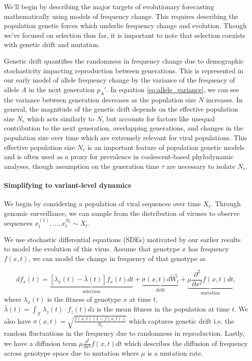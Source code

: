 We'll begin by describing the major targets of evolutionary forecasting mathematically using models of frequency change.
This requires describing the population genetic forces which underlie frequency change and evolution.
Though we've focused on selection thus far, it is important to note that selection coexists with genetic drift and mutation.

Genetic drift quantifies the randomness in frequency change due to demographic stochasticity impacting reproduction between generations.
This is represented in our early model of allele frequency change by the variance of the frequency of allele $A$ in the next generation $p_A'$.
In equation \ref{eq:allele_variance}, we can see the variance between generation decreases as the population size $N$ increases.
In general, the magnitude of the genetic drift depends on the effective population size $N_e$ which acts similarly to $N$, but accounts for factors like unequal contribution to the next generation, overlapping generations, and changes in the population size over time which are extremely relevant for viral populations.
This effective population size $N_e$ is an important feature of population genetic models and is often used as a proxy for prevalence in coalescent-based phylodynamic analyses, though assumption on the generation time $\tau$ are necessary to isolate $N_e$. \cite{MullerWagner2021}

\paragraph{Simplifying to variant-level dynamics}

We begin by considering a population of viral sequences over time $X_t$.
Through genomic surveillance, we can sample from the distribution of viruses to observe sequences $x_t^{(1)}, \ldots, x_t^{{N_t}} \sim X_t$.

We use stochastic differential equations (SDEs) motivated by our earlier results to model the evolution of this virus.
Assume that genotype $x$ has frequency $f(x, t)$, we can model the change in frequency of that genotype as

\begin{equation}
  df_x(t) = \underbrace{\left[\lambda_{x}(t) - \bar{\lambda}(t)\right] f_x(t) dt}_{\text{selection}} + \underbrace{\sigma(x, t) d\vec{W}_{t}}_{\text{drift}} + \underbrace{\mu \frac{\partial^2 }{\partial x^2} f(x,t) dt}_{\text{mutation}},
\end{equation}
where $\lambda_x(t)$ is the fitness of genotype $x$ at time $t$, $\bar{\lambda}(t) = \int_{\mathcal{X}} \lambda_z(t)\cdot f_z(t) dz$ is the mean fitness in the population at time $t$.
We also have $\sigma(x, t) = \sqrt{\frac{f(x,t) (1 - f(x,t))}{N_e}}$ which captures genetic drift i.e. the random fluctuations in the frequency due to randomness in reproduction.
Lastly, we have a diffusion term $\mu \frac{\partial^2 }{\partial x^2} f(x,t) dt$ which describes the diffusion of frequency across genotype space due to mutation where $\mu$ is a mutation rate.


